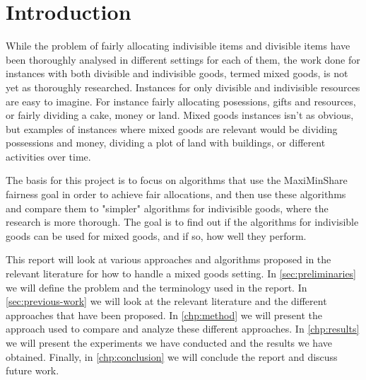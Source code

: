 \chapter{Introduction}\label{chp:introduction}


While the problem of fairly allocating indivisible items and divisible items have been thoroughly analysed in different settings for each of them, the work done for instances with both divisible and indivisible goods, termed mixed goods, is not yet as thoroughly researched. Instances for only divisible and indivisible resources are easy to imagine. For instance fairly allocating posessions, gifts and resources, or fairly dividing a cake, money or land. Mixed goods instances isn't as obvious, but examples of instances where mixed goods are relevant would be dividing possessions and money, dividing a plot of land with buildings, or different activities over time.

The basis for this project is to focus on algorithms that use the MaxiMinShare fairness goal in order to achieve fair allocations, and then use these algorithms and compare them to "simpler" algorithms for indivisible goods, where the research is more thorough. The goal is to find out if the algorithms for indivisible goods can be used for mixed goods, and if so, how well they perform.


This report will look at various approaches and algorithms proposed in the relevant literature for how to handle a mixed goods setting. In \autoref{sec:preliminaries} we will define the problem and the terminology used in the report. In \autoref{sec:previous-work} we will look at the relevant literature and the different approaches that have been proposed. In \autoref{chp:method} we will present the approach used to compare and analyze these different approaches. In \autoref{chp:results} we will present the experiments we have conducted and the results we have obtained. Finally, in \autoref{chp:conclusion} we will conclude the report and discuss future work.



